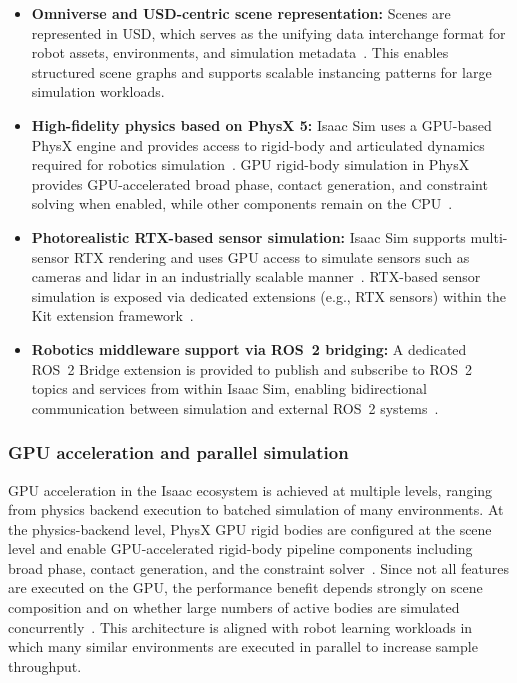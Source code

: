 \begin{itemize}
    \item \textbf{Omniverse and \ac{USD}-centric scene representation:} Scenes are represented in \ac{USD}, which serves as the unifying data interchange format for robot assets, environments, and simulation metadata~\cite{nvidia_isaac_sim_510_what_is}. This enables structured scene graphs and supports scalable instancing patterns for large simulation workloads.
    \item \textbf{High-fidelity physics based on PhysX 5:} Isaac Sim uses a GPU-based PhysX engine and provides access to rigid-body and articulated dynamics required for robotics simulation~\cite{nvidia_isaac_sim_510_what_is}. GPU rigid-body simulation in PhysX provides GPU-accelerated broad phase, contact generation, and constraint solving when enabled, while other components remain on the CPU~\cite{physx_gpu_rigid_bodies_510}.
    \item \textbf{Photorealistic RTX-based sensor simulation:} Isaac Sim supports multi-sensor RTX rendering and uses GPU access to simulate sensors such as cameras and lidar in an industrially scalable manner~\cite{nvidia_isaac_sim_510_what_is}. RTX-based sensor simulation is exposed via dedicated extensions (e.g., RTX sensors) within the Kit extension framework~\cite{nvidia_isaac_sim_510_extensions_api}.
    \item \textbf{Robotics middleware support via \ac{ROS}~2 bridging:} A dedicated \ac{ROS}~2 Bridge extension is provided to publish and subscribe to \ac{ROS}~2 topics and services from within Isaac Sim, enabling bidirectional communication between simulation and external \ac{ROS}~2 systems~\cite{nvidia_isaac_sim_510_extensions_api}.
\end{itemize}

\subsubsection{GPU acceleration and parallel simulation}
GPU acceleration in the Isaac ecosystem is achieved at multiple levels, ranging from physics backend execution to batched simulation of many environments. At the physics-backend level, PhysX GPU rigid bodies are configured at the scene level and enable GPU-accelerated rigid-body pipeline components including broad phase, contact generation, and the constraint solver~\cite{physx_gpu_rigid_bodies_510}. Since not all features are executed on the GPU, the performance benefit depends strongly on scene composition and on whether large numbers of active bodies are simulated concurrently~\cite{physx_gpu_rigid_bodies_510}. This architecture is aligned with robot learning workloads in which many similar environments are executed in parallel to increase sample throughput.

